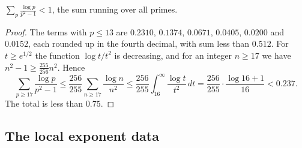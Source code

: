 \begin{lemma}\label{r5:lem:logsum}
$\displaystyle\sum_{p}\frac{\log p}{p^2-1}<1$, the sum running over all primes.
\end{lemma}

\begin{proof}
The terms with $p\le13$ are $0.2310$, $0.1374$, $0.0671$, $0.0405$, $0.0200$ and $0.0152$, each rounded up in the fourth decimal, with sum less than $0.512$. For $t\ge e^{1/2}$ the function $\log t/t^2$ is decreasing, and for an integer $n\ge17$ we have $n^2-1\ge\frac{255}{256}n^2$. Hence
\[
\sum_{p\ge17}\frac{\log p}{p^2-1}\le\frac{256}{255}\sum_{n\ge17}\frac{\log n}{n^2}\le\frac{256}{255}\int_{16}^\infty\frac{\log t}{t^2}\,dt=\frac{256}{255}\cdot\frac{\log16+1}{16}<0.237 .
\]
The total is less than $0.75$.
\end{proof}

\subsection{The local exponent data}\label{r5:sec:localdata}

